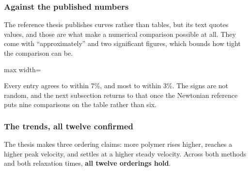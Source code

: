 \subsubsection{Against the published numbers}

The reference thesis publishes curves rather than tables, but its text quotes
values, and those are what make a numerical comparison possible at all. They
come with ``approximately'' and two significant figures, which bounds how tight
the comparison can be.

\begin{table}[htbp]
\centering
\caption{Measured against the values the reference thesis states in its text.}
\label{tab:vethesis}
\small
\begin{adjustbox}{max width=\linewidth}
\end{adjustbox}
\end{table}

Every entry agrees to within 7\%, and most to within 3\%. The signs are not
random, and the next subsection returns to that once the Newtonian reference
puts nine comparisons on the table rather than six.

\subsubsection{The trends, all twelve confirmed}

The thesis makes three ordering claims: more polymer rises higher, reaches a
higher peak velocity, and settles at a higher steady velocity. Across both
methods and both relaxation times, \textbf{all twelve orderings hold}.

\begin{center}
\small
{}
\end{center}

